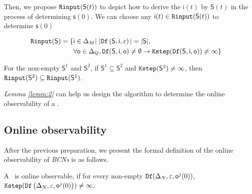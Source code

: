 Then, we propose ${\tt Rinput}(\mathsf{S}(t))$ to depict how to derive the $\mathsf{i}(t)$ by $\mathsf{S}(t)$ in the process of determining $\mathsf{s}(0)$. We can choose any $\mathsf{i}(t)\in {\tt Rinput}(\mathsf{S}(t))$ to determine $\mathsf{s}(0)$

\begin{definition}[$\Ri(\mathsf{S})$] 
\begin{equation*}
\begin{split}
{\tt Rinput}(\mathsf{S})=\{&\mathsf{i}\in \Delta_M|\  |{\tt Df}\left(\mathsf{S},\mathsf{i},\varepsilon\right)|=|\mathsf{S}|, \\
& \forall \mathsf{o} \in \Delta_Q, {\tt Df}(\mathsf{S},\mathsf{i},\mathsf{o})\ne \emptyset \rightarrow {\tt Kstep}({\tt Df}(\mathsf{S},\mathsf{i},\mathsf{o}))\ne \infty\}
\end{split}
\end{equation*}
\end{definition}
\begin{lemma}
For the non-empty $\mathsf{S}^{1}$ and $\mathsf{S}^{2}$, if $\mathsf{S}^{1}\subseteq\mathsf{S}^{2}$ and ${\tt Kstep}(\mathsf{S}^{2})\ne\infty$, then ${\tt Rinput}(\mathsf{S}^2)\subseteq{\tt Rinput}(\mathsf{S}^1)$.
\label{lemm:2}
\end{lemma}

{\em Lemma \ref{lemm:2}} can help us design the algorithm to determine the online observability of a \BCN.%

\subsection{Online observability}
After the previous preparation, we present the formal definition of the online observability of {\em BCNs} is as follows.

\begin{definition}
 A \BCN\ is online observable,
if for every non-empty ${\tt Df}(\Delta_N,\varepsilon, \mathsf{o}^{j}(0))$, ${\tt Kstep}({\tt Df}\left(\Delta_N,\varepsilon,\mathsf{o}^{j}(0)\right))\ne\infty$.
\end{definition}


